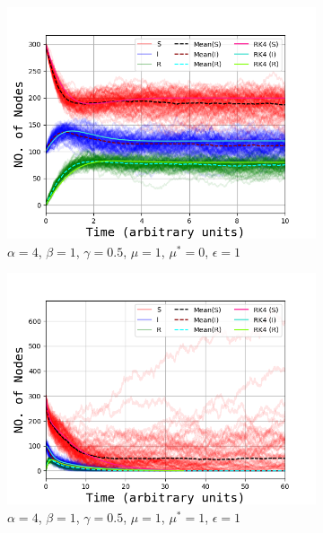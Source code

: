  \begin{figure}[H]
		\centering
		\begin{subfigure}{0.49\linewidth}
			\includegraphics[width=1.1\linewidth]{Figures/OppgB_1_0_1.png}
			\caption{$\alpha = 4$, $\beta = 1$, $\gamma=0.5$, $\mu=1$, $\mu^*=0$, $\epsilon=1$}
		\end{subfigure}
		\begin{subfigure}{0.49\linewidth}
			\includegraphics[width=1.1\linewidth]{Figures/OppgB_1_1_1.png}
			\caption{$\alpha = 4$, $\beta = 1$, $\gamma=0.5$, $\mu=1$, $\mu^*=1$, $\epsilon=1$}
		\end{subfigure}
		\begin{subfigure}{0.49\linewidth}

\end{subfigure}
\end{figure}
